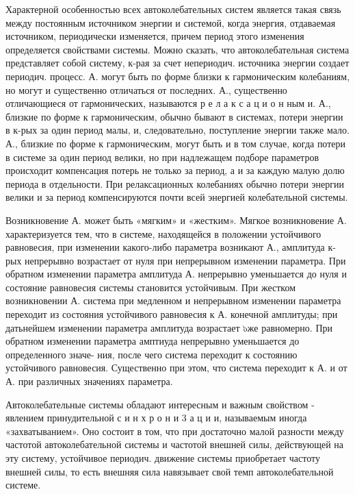 \documentclass[10pt]{article}
\begin{document}
Характерной особенностью всех автоколебательных систем является такая связь между постоянным источником энергии и системой, когда энергия, отдаваемая источником, периодически изменяется, причем период этого изменения определяется свойствами системы. Можно сказать, что автоколебательная система представляет собой систему, к-рая за счет непериодич. источника энергии создает периодич. процесс. А. могут быть по форме близки к гармоническим колебаниям, но могут и существенно отличаться от последних. А., существенно отличающиеся от гармонических, называются р е л а к с а ц и о н ным и. А., близкие по форме к гармоническим, обычно бывают в системах, потери энергии в к-рых за один период малы, и, следовательно, поступление энергии также мало. А., близкие по форме к гармоническим, могут быть и в том случае, когда потери в системе за один период велики, но при надлежащем подборе параметров происходит компенсация потерь не только за период, а и за каждую малую долю периода в отдельности. При релаксационных колебаниях обычно потери энергии велики и за период компенсируются почти всей энергией колебательной системы.



Возникновение А. может быть «мягким» и «жестким». Мягкое возникновение А. характеризуется тем, что в системе, находящейся в положении устойчивого равновесия, при изменении какого-либо параметра возникают А., амплитуда к-рых непрерывно возрастает от нуля при непрерывном изменении параметра. При обратном изменении параметра амплитуда А. непрерывно уменьшается до нуля и состояние равновесия системы становится устойчивым. При жестком возникновении А. система при медленном и непрерывном изменении параметра переходит из состояния устойчивого равновесия к А. конечной амплитуды; при датьнейшем изменении параметра амплитуда возрастает ๖же равномерно. При обратном изменении параметра амптиуда непрерывно уменьшается до определенного значе- ния, после чего система переходит к состоянию устойчивого равновесия. Существенно при этом, что система переходит к А. и от А. при различных значениях параметра.



Автоколебательные системы обладают интересным и важным свойством - явлением принудительной с и н х р о н и 3 а ц и и, называемым иногда «захватыванием». Оно состоит в том, что при достаточно малой разности между частотой автоколебательной системы и частотой внешней силы, действующей на эту систему, устойчивое периодич. движение системы приобретает частоту внешней силы, то есть внешняя сила навязывает свой темп автоколебательной системе.
\end{document}
